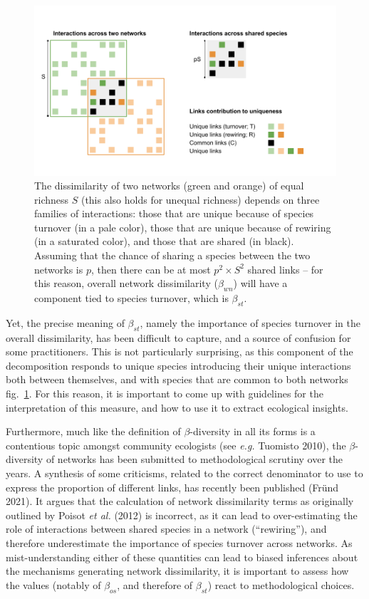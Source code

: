 \documentclass[11pt]{article}
\makeatletter
\def\maxwidth{\ifdim\Gin@nat@width>\linewidth\linewidth
\else\Gin@nat@width\fi}
\let\Oldincludegraphics\includegraphics
\renewcommand{\includegraphics}[1]{\Oldincludegraphics[width=\maxwidth]{#1}}
\makeatother
\begin{document}
\begin{figure}
\hypertarget{fig:conceptual}{%
\centering
\includegraphics{figures/betadiv_response_figure.png}
\caption{The dissimilarity of two networks (green and orange) of equal
richness \(S\) (this also holds for unequal richness) depends on three
families of interactions: those that are unique because of species
turnover (in a pale color), those that are unique because of rewiring
(in a saturated color), and those that are shared (in black). Assuming
that the chance of sharing a species between the two networks is \(p\),
then there can be at most \(p^2\times S^2\) shared links -- for this
reason, overall network dissimilarity (\(\beta_{wn}\)) will have a
component tied to species turnover, which is
\(\beta_{st}\).}\label{fig:conceptual}
}
\end{figure}

Yet, the precise meaning of \(\beta_{st}\), namely the importance of
species turnover in the overall dissimilarity, has been difficult to
capture, and a source of confusion for some practitioners. This is not
particularly surprising, as this component of the decomposition responds
to unique species introducing their unique interactions both between
themselves, and with species that are common to both networks
fig.~\ref{fig:conceptual}. For this reason, it is important to come up
with guidelines for the interpretation of this measure, and how to use
it to extract ecological insights.

Furthermore, much like the definition of \(\beta\)-diversity in all its
forms is a contentious topic amongst community ecologists (see
\emph{e.g.} Tuomisto 2010), the \(\beta\)-diversity of networks has been
submitted to methodological scrutiny over the years. A synthesis of some
criticisms, related to the correct denominator to use to express the
proportion of different links, has recently been published (Fründ 2021).
It argues that the calculation of network dissimilarity terms as
originally outlined by Poisot \emph{et al.} (2012) is incorrect, as it
can lead to over-estimating the role of interactions between shared
species in a network (``rewiring''), and therefore underestimate the
importance of species turnover across networks. As mist-understanding
either of these quantities can lead to biased inferences about the
mechanisms generating network dissimilarity, it is important to assess
how the values (notably of \(\beta_{os}\), and therefore of
\(\beta_{st}\)) react to methodological choices.
\end{document}
